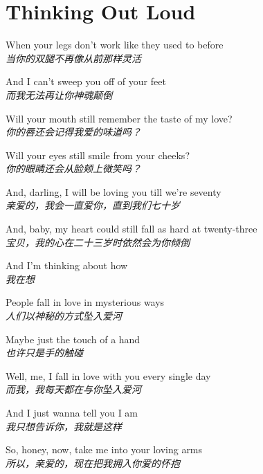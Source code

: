 \section{Thinking Out Loud}

\thispagestyle{empty}


\begin{spacing}{1.5}
\begin{flushleft}
When your legs don't work like they used to before\\
\textit{当你的双腿不再像从前那样灵活}\lyricspace

And I can't sweep you off of your feet\\
\textit{而我无法再让你神魂颠倒}\lyricspace

Will your mouth still remember the taste of my love?\\
\textit{你的唇还会记得我爱的味道吗？}\lyricspace

Will your eyes still smile from your cheeks?\\
\textit{你的眼睛还会从脸颊上微笑吗？}\lyricspace

And, darling, I will be loving you till we're seventy\\
\textit{亲爱的，我会一直爱你，直到我们七十岁}\lyricspace

And, baby, my heart could still fall as hard at twenty-three\\
\textit{宝贝，我的心在二十三岁时依然会为你倾倒}\lyricspace

And I'm thinking about how\\
\textit{我在想}\lyricspace

People fall in love in mysterious ways\\
\textit{人们以神秘的方式坠入爱河}\lyricspace

Maybe just the touch of a hand\\
\textit{也许只是手的触碰}\lyricspace

Well, me, I fall in love with you every single day\\
\textit{而我，我每天都在与你坠入爱河}\lyricspace

And I just wanna tell you I am\\
\textit{我只想告诉你，我就是这样}\lyricspace

So, honey, now, take me into your loving arms\\
\textit{所以，亲爱的，现在把我拥入你爱的怀抱}\lyricspace


\end{flushleft}
\end{spacing}
